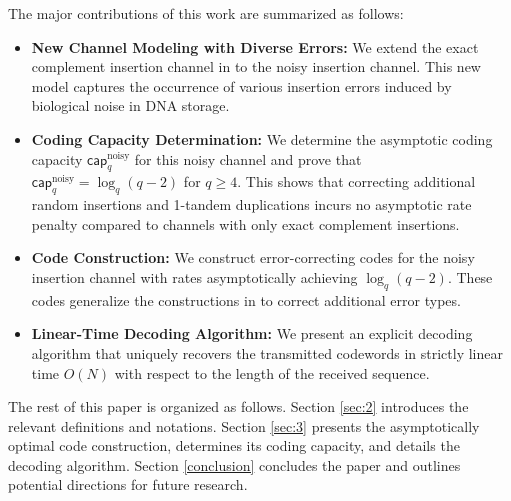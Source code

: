 \documentclass[pdflatex,sn-mathphys-num]{sn-jnl}
\theoremstyle{theorem}%
\theoremstyle{definition}
\theoremstyle{construction}
\newtheorem{open problem}{Open problem}
\begin{document}
 The major contributions of this work are summarized as follows:
 \begin{itemize}
 	\item \textbf{New Channel Modeling with Diverse Errors:} 
 	We extend the exact complement insertion channel in \cite{ys2} to the noisy insertion channel. This new model captures the occurrence of various insertion errors induced by biological noise in DNA storage.
 	
 	\item \textbf{Coding Capacity Determination:} 
 	We determine the asymptotic coding capacity $\mathsf{cap}^{\text{noisy}}_{q}$ for this noisy channel and prove that $\mathsf{cap}^{\text{noisy}}_{q} = \log_{q}(q-2)$ for $q \ge 4$. This shows that correcting additional random insertions and 1-tandem duplications incurs no asymptotic rate penalty compared to channels with only exact complement insertions.
 	
 	\item \textbf{Code Construction:} 
 	We construct error-correcting codes for the noisy insertion channel with rates asymptotically achieving $\log_{q}(q-2)$. These codes generalize the constructions in \cite{ys2} to correct additional error types.
 	
 	\item \textbf{Linear-Time Decoding Algorithm:} 
 	We present an explicit decoding algorithm that uniquely recovers the transmitted codewords in strictly linear time $O(N)$ with respect to the length of the received sequence.
 \end{itemize} 
 
 The rest of this paper is organized as follows. Section \ref{sec:2} introduces the relevant definitions and notations. Section \ref{sec:3} presents the asymptotically optimal code construction, determines its coding capacity, and details the decoding algorithm. Section \ref{conclusion} concludes the paper and outlines potential directions for future research.

	
\end{document}
